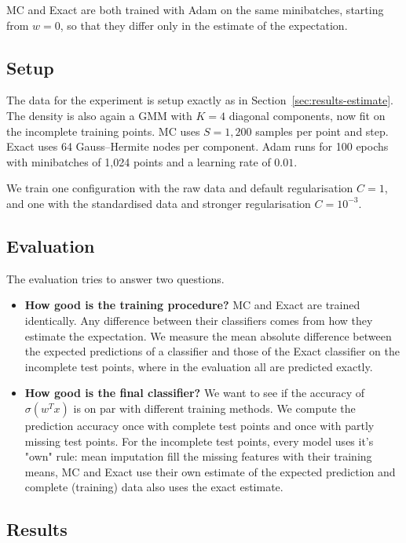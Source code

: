 MC and Exact are both trained with Adam on the same minibatches,
starting from $w = 0$, so that they differ only in the estimate of the
expectation.

\subsection{Setup}
\label{subsec:training-setup}

The data for the experiment is setup exactly as in Section~\ref{sec:results-estimate}.
The density is also again a GMM with $K = 4$ diagonal
components, now fit on the incomplete training points. MC uses
$S = 1{,}200$ samples per point and step. Exact uses 64 Gauss--Hermite
nodes per component. Adam runs for 100 epochs with minibatches of 1{,}024 points
and a learning rate of $0.01$.

We train one configuration with the raw data and default regularisation $C = 1$,
and one with the standardised data and stronger regularisation $C = 10^{-3}$.

\subsection{Evaluation}
\label{subsec:training-evaluation}

The evaluation tries to answer two questions.
\begin{itemize}
  \item \textbf{How good is the training procedure?}
        MC and Exact are trained identically. Any difference between
        their classifiers comes from how they estimate the expectation. We measure
        the mean absolute difference between the expected predictions of a
        classifier and those of the Exact classifier on the incomplete test points, where in the evaluation all are predicted exactly.
  \item \textbf{How good is the final classifier?} We want to see if the accuracy of
        $\sigma(w^T x)$ is on par with different training methods.
        We compute the prediction accuracy once with complete test points
        and once with partly missing test points.
        For the incomplete test points, every model uses it's "own"
        rule:  mean imputation fill the missing features with
        their training means, MC and Exact use their own estimate of the
        expected prediction and complete (training) data also uses the exact estimate.
\end{itemize}

\subsection{Results}
\label{subsec:training-results}

